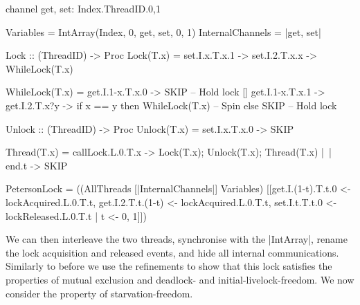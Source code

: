 \begin{cspm}[caption={The CSP implementation of the Peterson Lock}]
channel get, set: Index.ThreadID.{0,1}

Variables = IntArray(Index, 0, get, set, 0, 1)
InternalChannels = {|get, set|}

Lock :: (ThreadID) -> Proc
Lock(T.x) =  set.I.x.T.x.1 -> set.I.2.T.x.x -> WhileLock(T.x)

WhileLock(T.x) = 
     get.I.1-x.T.x.0 -> SKIP -- Hold lock
   [] get.I.1-x.T.x.1 ->  get.I.2.T.x?y ->
                         if x == y then WhileLock(T.x) -- Spin
                         else SKIP -- Hold lock

Unlock :: (ThreadID) -> Proc
Unlock(T.x) = set.I.x.T.x.0 -> SKIP

Thread(T.x) =     callLock.L.0.T.x -> Lock(T.x); Unlock(T.x); Thread(T.x)
              |~| end.t -> SKIP

PetersonLock = ((AllThreads [|InternalChannels|] Variables)
                  [[get.I.(1-t).T.t.0 <- lockAcquired.L.0.T.t,
                  get.I.2.T.t.(1-t) <- lockAcquired.L.0.T.t,
                  set.I.t.T.t.0 <- lockReleased.L.0.T.t | t <- {0, 1}]])
\end{cspm}

We can then interleave the two threads, synchronise with the |IntArray|, rename the lock acquisition and released events, and hide all internal communications. Similarly to before we use the refinements to show that this lock satisfies the properties of mutual exclusion and deadlock- and initial-livelock-freedom. We now consider the property of starvation-freedom.




